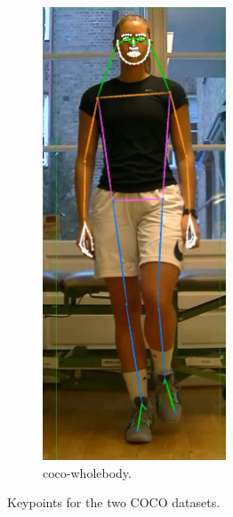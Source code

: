 \begin{figure}
\begin{subfigure}[t]{0.4\textwidth}
  \includegraphics[width=0.6\textwidth]{files/figs/coco-wholebody.png}
  \caption{\gls{coco}-wholebody.}
  \label{fig:coco-wholebody}
 \end{subfigure}
 \caption{Keypoints for the two COCO datasets.}
\end{figure}


